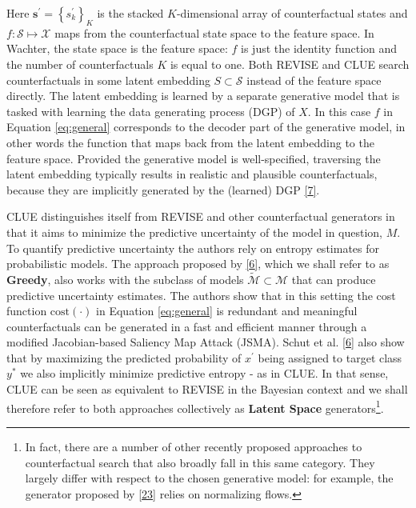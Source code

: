 \documentclass[conference,final,]{IEEEtran}
\theoremstyle{definition}
\theoremstyle{definition}
\theoremstyle{definition}
\theoremstyle{definition}
\theoremstyle{remark}
\begin{document}
Here \(\mathbf{s}^\prime=\left\{s_k^\prime\right\}_K\) is the stacked \(K\)-dimensional array of counterfactual states and \(f: \mathcal{S} \mapsto \mathcal{X}\) maps from the counterfactual state space to the feature space. In Wachter, the state space is the feature space: \(f\) is just the identity function and the number of counterfactuals \(K\) is equal to one. Both REVISE and CLUE search counterfactuals in some latent embedding \(S \subset \mathcal{S}\) instead of the feature space directly. The latent embedding is learned by a separate generative model that is tasked with learning the data generating process (DGP) of \(X\). In this case \(f\) in Equation \eqref{eq:general} corresponds to the decoder part of the generative model, in other words the function that maps back from the latent embedding to the feature space. Provided the generative model is well-specified, traversing the latent embedding typically results in realistic and plausible counterfactuals, because they are implicitly generated by the (learned) DGP \protect\hyperlink{ref-joshi2019towards}{{[}7{]}}.

CLUE distinguishes itself from REVISE and other counterfactual generators in that it aims to minimize the predictive uncertainty of the model in question, \(M\). To quantify predictive uncertainty the authors rely on entropy estimates for probabilistic models. The approach proposed by \protect\hyperlink{ref-schut2021generating}{{[}6{]}}, which we shall refer to as \textbf{Greedy}, also works with the subclass of models \(\tilde{\mathcal{M}}\subset\mathcal{M}\) that can produce predictive uncertainty estimates. The authors show that in this setting the cost function \(\text{cost}(\cdot)\) in Equation \eqref{eq:general} is redundant and meaningful counterfactuals can be generated in a fast and efficient manner through a modified Jacobian-based Saliency Map Attack (JSMA). Schut et al. \protect\hyperlink{ref-schut2021generating}{{[}6{]}} also show that by maximizing the predicted probability of \(x^\prime\) being assigned to target class \(y^*\) we also implicitly minimize predictive entropy - as in CLUE. In that sense, CLUE can be seen as equivalent to REVISE in the Bayesian context and we shall therefore refer to both approaches collectively as \textbf{Latent Space} generators\footnote{In fact, there are a number of other recently proposed approaches to counterfactual search that also broadly fall in this same category. They largely differ with respect to the chosen generative model: for example, the generator proposed by \protect\hyperlink{ref-dombrowski2021diffeomorphic}{{[}23{]}} relies on normalizing flows.}.
\end{document}
